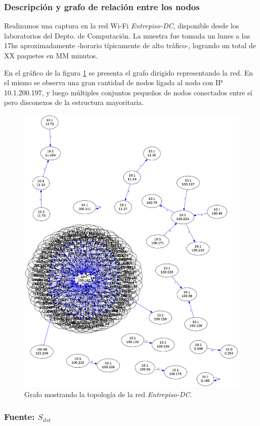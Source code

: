 \subsubsection{Descripción y grafo de relación entre los nodos}

Realizamos una captura en la red Wi-Fi \emph{Entrepiso-DC}, disponible desde los laboratorios del Depto. de Computación. La muestra fue tomada un lunes a las 17hs aproximadamente -horario típicamente de alto tráfico-, logrando un total de XX paquetes en MM minutos.

En el gráfico de la figura \ref{fig:entrepiso-dc-grafo} se presenta el grafo dirigido representando la red. En el mismo se observa una gran cantidad de nodos ligada al nodo con IP 10.1.200.197, y luego múltiples conjuntos pequeños de nodos conectados entre sí pero disconexos de la estructura mayoritaria.

\begin{figure}[H]
  \begin{center}
    \includegraphics[width=0.6\linewidth]{../imgs/red-entrepiso-dc_red.png}
    \caption{Grafo mostrando la topología de la red \emph{Entrepiso-DC}.}
    \label{fig:entrepiso-dc-grafo}
  \end{center}
\end{figure}

\subsubsection{Fuente: $S_{dst}$}

